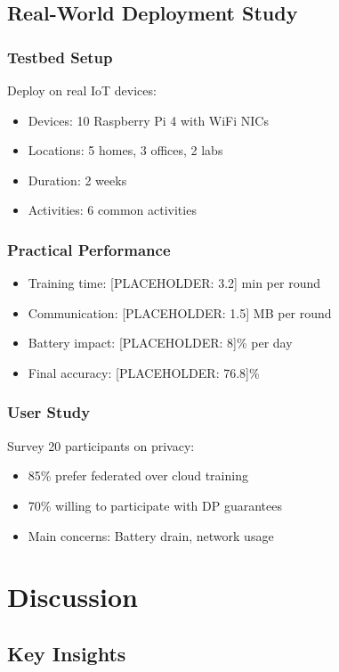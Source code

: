 \documentclass[journal]{IEEEtran}
\begin{document}
\subsection{Real-World Deployment Study}

\subsubsection{Testbed Setup}
Deploy on real IoT devices:
\begin{itemize}
\item Devices: 10 Raspberry Pi 4 with WiFi NICs
\item Locations: 5 homes, 3 offices, 2 labs
\item Duration: 2 weeks
\item Activities: 6 common activities
\end{itemize}

\subsubsection{Practical Performance}
\begin{itemize}
\item Training time: [PLACEHOLDER: 3.2] min per round
\item Communication: [PLACEHOLDER: 1.5] MB per round
\item Battery impact: [PLACEHOLDER: 8]\% per day
\item Final accuracy: [PLACEHOLDER: 76.8]\%
\end{itemize}

\subsubsection{User Study}
Survey 20 participants on privacy:
\begin{itemize}
\item 85\% prefer federated over cloud training
\item 70\% willing to participate with DP guarantees
\item Main concerns: Battery drain, network usage
\end{itemize}

\section{Discussion}

\subsection{Key Insights}
\end{document}
